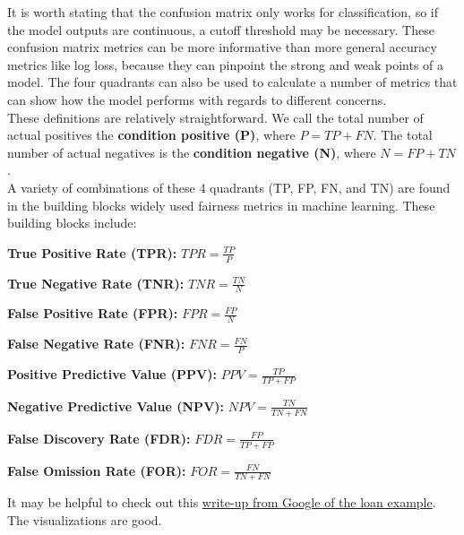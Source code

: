 \documentclass[assignment02_Solutions]{subfiles}
\begin{document}
It is worth stating that the confusion matrix only works for classification, so if the model outputs are continuous, a cutoff threshold may be necessary. These confusion matrix metrics can be more informative than more general accuracy metrics like log loss, because they can pinpoint the strong and weak points of a model. The four quadrants can also be used to calculate a number of metrics that can show how the model performs with regards to different concerns. \\

These definitions are relatively straightforward. We call the total number of actual positives the \textbf{condition positive (P)}, where $P = TP + FN$. The total number of actual negatives is the \textbf{condition negative (N)}, where $N = FP + TN$. \\

A variety of combinations of these 4 quadrants (TP, FP, FN, and TN) are found in the building blocks widely used fairness metrics in machine learning. These building blocks include:

\bi
\item \textbf{True Positive Rate (TPR): } $TPR = \frac{TP}{P}$
\item \textbf{True Negative Rate (TNR): }  $TNR = \frac{TN}{N}$
\item \textbf{False Positive Rate (FPR): } $FPR = \frac{FP}{N}$
\item \textbf{False Negative Rate (FNR): } $FNR = \frac{FN}{P}$
\item \textbf{Positive Predictive Value (PPV): } $PPV = \frac{TP}{TP+FP}$
\item \textbf{Negative Predictive Value (NPV): } $NPV = \frac{TN}{TN+FN}$
\item \textbf{False Discovery Rate (FDR): } $FDR = \frac{FP}{TP+FP}$
\item \textbf{False Omission Rate (FOR): } $FOR = \frac{FN}{TN+FN}$
\ei

It may be helpful to check out this \href{https://research.google.com/bigpicture/attacking-discrimination-in-ml/}{write-up from Google of the loan example}. The visualizations are good.
\end{document}
